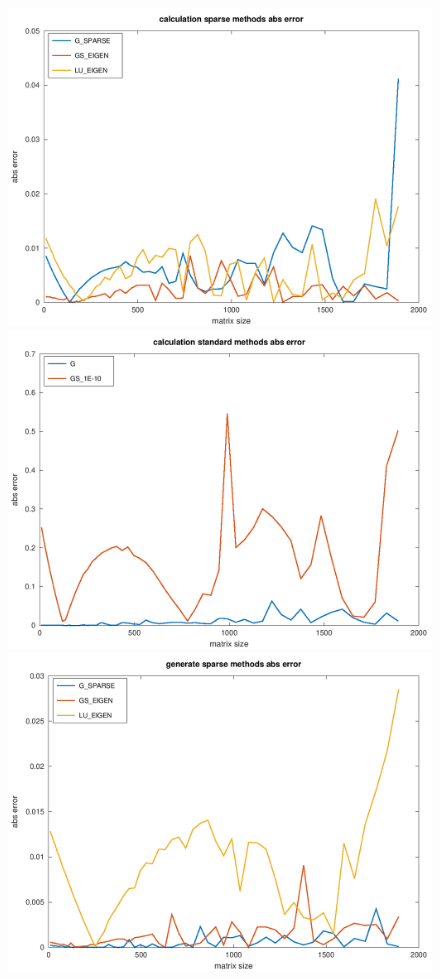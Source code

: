 \documentclass[10pt]{article}
\begin{document}
\begin{figure}[h]
\centering
\includegraphics[scale=0.45]{plots/03_calc_abs_error_sparse_methods.png}
\includegraphics[scale=0.45]{plots/04_calc_abs_error_standard_methods.png}
\includegraphics[scale=0.45]{plots/05_gen_abs_error_sparse_methods.png}

\end{figure}
\end{document}
